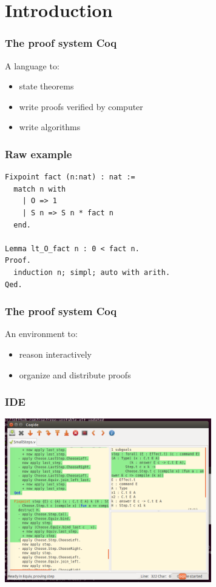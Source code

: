 \section{Introduction}
\begin{frame}
  \frametitle{The proof system Coq}
  A language to:
  \begin{itemize}
    \item state theorems
    \item write proofs verified by computer
    \item write algorithms
  \end{itemize}
\end{frame}

\begin{frame}[fragile]
  \frametitle{Raw example}
  \begin{verbatim}
Fixpoint fact (n:nat) : nat :=
  match n with
    | O => 1
    | S n => S n * fact n
  end.

Lemma lt_O_fact n : 0 < fact n.
Proof.
  induction n; simpl; auto with arith.
Qed.
  \end{verbatim}
\end{frame}

\begin{frame}
  \frametitle{The proof system Coq}
  An environment to:
  \begin{itemize}
    \item reason interactively
    \item organize and distribute proofs
  \end{itemize}
\end{frame}

\begin{frame}
  \frametitle{IDE}
  \begin{center}
    \includegraphics[width=9cm]{images/ide}
  \end{center}
\end{frame}

